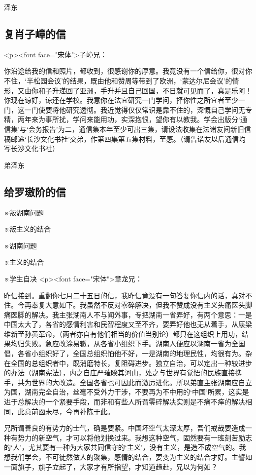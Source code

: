  泽东
\subsection{复肖子嶂的信}
<p><font face="宋体">子嶂兄：

你沿途给我的信和照片，都收到，很感谢你的厚意。我竟没有一个信给你，很对你不住，‘半松园会议’的结果，既由他和赞周等带到了欧洲，‘蒙达尔尼会议’的情形，又由你和子升递回了亚洲，手升并且自己回国，不日就可见而了，真是乐阿！你现在谅好，谅还在学校。我意你在法宜研究一门学问，择你性之所宜者至少一门，这一门使要将他研究透彻。我近觉得仅仅常识是靠不住的，深慨自己学问无专精，两年来为事所扰，学问来能用功，实深抱恨，望你有以教我。学会出版分‘通信集’与‘会务报告’为二，通信集本年至少可出三集，请设法收集在法诸友间新旧信稿邮递‘长沙文化书社’交弟，作第四集第五集材料，至感。（请告诺友以后通信均写长沙文化书社）

 弟泽东
\subsection{给罗璈阶的信}

※叛湖南问题

※叛主义的结合

※湖南问题

※主义的结合

※学生自决
<p><font face="宋体">章龙兄：

昨信接到。重翻你七月二十五日的信，我昨信竟没有一句答复你信内的话，真对不住。今再奉复大意如下。我虽然不反对零碎解决，但我不赞成没有主义头痛医头脚痛医脚的解决。我主张湖南人不与闻外事，专把湖南一省弄好，有两个意思：一是中国太大了，各省的感情利害和民智程度又至不齐，要弄好他也无从着手，从康梁维新至孙黄革命，（两者亦自有他们相当的价值当别论）都只在这组织上用功，结果均归失败。急应改涂易辙，从各省小组织下手。湖南人便应以湖南一省为全国倡，各省小组织好了，全国总组织怕他不好，一是湖南的地理民性，均很有为。杂在全国的总组织者中，既消磨特长，复阻碍进步。独立自治，可以定出一种较进步的办法（湖南宪法），内之自庄严璀睽其河山，处之与世界有觉悟的民族直接携手，共为世界的大改造。全国各省也可因此而激厉进化。所以弟直主张湖南应自立为国，湖南完全自治，丝毫不受外力干涉，不要再为不中用的‘中国’所累，这实是进于总解决的一个紧要手段，而非和有些人所谓零碎解决实则是不痛不痒的解决相同，此意前函未尽，今再补陈于此。

兄所谓善良的有势力的士气，确是要紧。中国坏空气太深太厚，吾们戒哉要造成一种有势力的新空气，才可以将他划换过来。我想这种空气，固然要有一班刻苦励志的‘人’，尤其要有一种为大家共同信守的‘主义’，没有主义，是造不成空气的。我想我们学会，不可徒然做人的聚集，感情的结合，要变为主义的结合才好。主譬如一面旗子，旗子立起了，大家才有所指望，才知道趋赴，兄以为何如？

